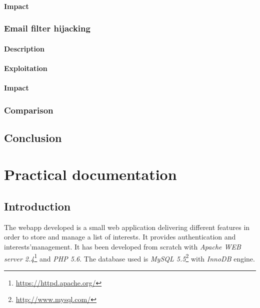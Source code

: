 \documentclass[a4paper,11pt,openany]{report}
\begin{document}
  \subsubsection{Impact}
  
  
  \subsection{Email filter hijacking}
  \subsubsection{Description}
  \subsubsection{Exploitation}
  \subsubsection{Impact}
  
  \subsection{Comparison}
  
  
  
  \section{Conclusion}

  
  
\appendix
{}

\chapter{Practical documentation} \label{app:practical_documentation}

\section{Introduction}
The webapp developed is a small web application delivering different features 
in order to store and manage a list of interests. It provides authentication and 
interests'management. It has been developed from scratch with \textit{Apache 
WEB server 2.4}\footnote{\url{https://httpd.apache.org/}} and \textit{PHP 5.6}. 
The database used is \textit{MySQL 5.5}\footnote{\url{http://www.mysql.com/}} with 
\textit{InnoDB} engine.
\end{document}
